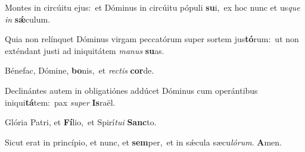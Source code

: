 Montes in circúitu ejus:~\reddagger et Dóminus in circúitu pópuli \textbf{su}i,~\redgreheightstar ex hoc nunc et us\textit{que} \textit{in} \textbf{sǽ}culum.

Quia non relínquet Dóminus virgam peccatórum super sortem jus\textbf{tó}rum:~\redgreheightstar ut non exténdant justi ad iniquitátem \textit{ma}\textit{nus} \textbf{su}as.

Bénefac, Dómine, \textbf{bo}nis,~\redgreheightstar et \textit{rec}\textit{tis} \textbf{cor}de.

Declinántes autem in obligatiónes addúcet Dóminus cum operántibus iniqui\textbf{tá}tem:~\redgreheightstar pax \textit{su}\textit{per} \textbf{Is}raël.

Glória Patri, et \textbf{Fí}lio,~\redgreheightstar et Spirí\textit{tu}\textit{i} \textbf{Sanc}to.

Sicut erat in princípio, et nunc, et \textbf{sem}per,~\redgreheightstar et in sǽcula sæcu\textit{ló}\textit{rum}. \textbf{A}men.

